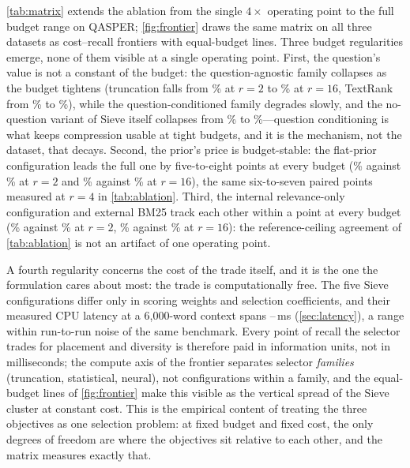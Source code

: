 \documentclass[pdflatex,sn-basic]{sn-jnl}
\theoremstyle{remark}
\newcommand{\method}{Sieve}
\begin{document}
\autoref{tab:matrix} extends the ablation from the single $4\times$
operating point to the full budget range on QASPER;
\autoref{fig:frontier} draws the same matrix on all three datasets as
cost--recall frontiers with equal-budget lines. Three budget
regularities emerge, none of them visible at a single operating
point. First, the question's value is not a constant of the budget:
the question-agnostic family collapses as the budget tightens
(truncation falls from \MxQHeaTwo\% at $r{=}2$ to \MxQHeaSixteen\% at
$r{=}16$, TextRank from \MxQTRTwo\% to \MxQTRSixteen\%), while the
question-conditioned family degrades slowly, and the no-question
variant of \method{} itself collapses from \MxQNoQTwo\% to
\MxQNoQSixteen\%---question conditioning is what keeps compression
usable at tight budgets, and it is the mechanism, not the dataset,
that decays. Second, the prior's price is budget-stable: the
flat-prior configuration leads the full one by five-to-eight points
at every budget (\MxQNoPosTwo\% against \MxQSieTwo\% at $r{=}2$ and
\MxQNoPosSixteen\% against \MxQSieSixteen\% at $r{=}16$), the same
six-to-seven paired points measured at $r{=}4$ in
\autoref{tab:ablation}. Third, the internal relevance-only
configuration and external BM25 track each other within a point at
every budget (\MxQRelOnlyTwo\% against \MxQBmTwo\% at $r{=}2$,
\MxQRelOnlySixteen\% against \MxQBmSixteen\% at $r{=}16$): the
reference-ceiling agreement of \autoref{tab:ablation} is not an
artifact of one operating point.

A fourth regularity concerns the cost of the trade itself, and it is
the one the formulation cares about most: the trade is
computationally free. The five \method{} configurations differ only
in scoring weights and selection coefficients, and their measured CPU
latency at a 6{,}000-word context spans \TimeVMinSixk--\TimeVMaxSixk\,ms
(\autoref{sec:latency}), a range within run-to-run noise of the same
benchmark. Every point of recall the selector trades for placement
and diversity is therefore paid in information units, not in
milliseconds; the compute axis of the frontier separates selector
\emph{families} (truncation, statistical, neural), not configurations
within a family, and the equal-budget lines of \autoref{fig:frontier}
make this visible as the vertical spread of the \method{} cluster at
constant cost. This is the empirical content of treating the three
objectives as one selection problem: at fixed budget and fixed cost,
the only degrees of freedom are where the objectives sit relative to
each other, and the matrix measures exactly that.
\end{document}
